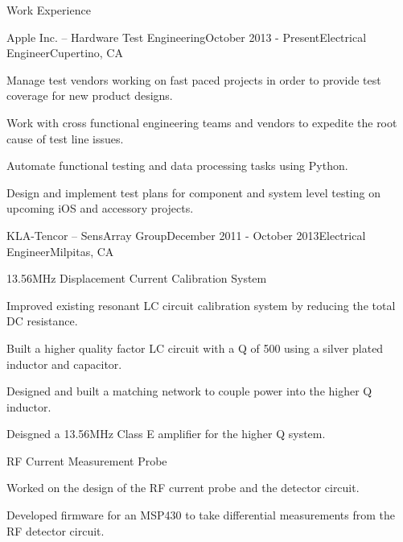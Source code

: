 \documentclass{resume} %
\begin{document}
\begin{rSection}{Work Experience}
\vspace{-0.5em}
\begin{rSubsection}{Apple Inc. -- Hardware Test Engineering}{October 2013 - Present}{Electrical Engineer}{Cupertino, CA}
\item Manage test vendors working on fast paced projects in order to provide test coverage for new product designs.
\item Work with cross functional engineering teams and vendors to expedite the root cause of test line issues.
\item Automate functional testing and data processing tasks using Python.
\item Design and implement test plans for component and system level testing on upcoming iOS and accessory projects.
\end{rSubsection}


\ssquish
\begin{rSubsection2}{KLA-Tencor -- SensArray Group}{December 2011 - October 2013}{Electrical Engineer}{Milpitas, CA}

\begin{rWorkProject}{13.56MHz Displacement Current Calibration System}
\item Improved existing resonant LC circuit calibration system by reducing the total DC resistance.
\item Built a higher quality factor LC circuit with a Q of 500 using a silver plated inductor and capacitor.
\item Designed and built a matching network to couple power into the higher Q inductor.
\item Deisgned a 13.56MHz Class E amplifier for the higher Q system.
\end{rWorkProject}

\begin{rWorkProject}{RF Current Measurement Probe}
\item Worked on the design of the RF current probe and the detector circuit.
\item Developed firmware for an MSP430 to take differential measurements from the RF detector circuit.
\end{rWorkProject}


\end{rSubsection2}
\end{rSection}
\end{document}
